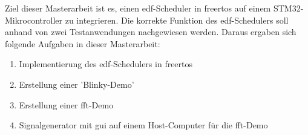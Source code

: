 \documentclass[../EDF Master Thesis.tex]{subfiles}
\begin{document}
    Ziel dieser Masterarbeit ist es, einen \ac{edf}-Scheduler in \ac{freertos} auf einem STM32-Mikrocontroller zu integrieren.
    Die korrekte Funktion des \ac{edf}-Schedulers soll anhand von zwei Testanwendungen nachgewiesen werden.
    Daraus ergaben sich folgende Aufgaben in dieser Masterarbeit:
    \begin{enumerate}
        \item Implementierung des \ac{edf}-Schedulers in \ac{freertos}
        \item Erstellung einer 'Blinky-Demo'
        \item Erstellung einer \ac{fft}-Demo
        \item Signalgenerator mit \ac{gui} auf einem Host-Computer für die \ac{fft}-Demo
    \end{enumerate}
\end{document}
